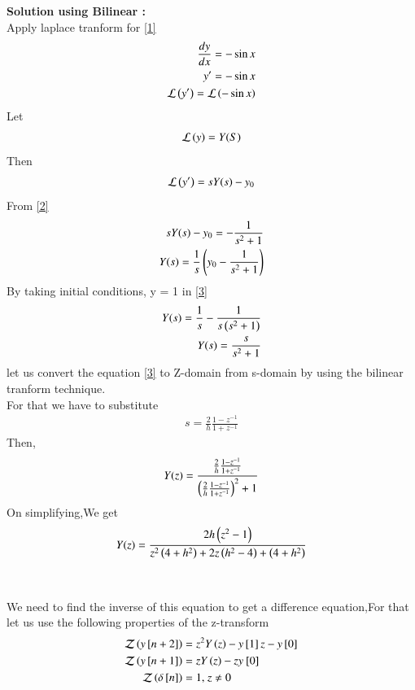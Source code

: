 \documentclass[journal]{IEEEtran}
\begin{document}
\textbf{Solution using Bilinear :} \\
Apply laplace tranform for \eqref{1} \\
\begin{align}
\frac{dy}{dx} = - \sin{x} \\
y' = - \sin{x} \\
\mathcal{L} \left(y'\right) = \mathcal{L} \left( - \sin{x} \right) \label{2}
\end{align}
Let 
\begin{align}
\mathcal{L} \left(y\right) = Y(S)\\
\end{align}
Then 
\begin{align}
\mathcal{L} \left(y'\right) = sY(s) - y_0
\end{align}
From \eqref{2}
\begin{align}
sY(s) - y_0 = -\frac{1}{s^2+1} \\
Y(s) = \frac{1}{s} \left(y_0 - \frac{1}{s^2+1}\right)  \label{3}
\end{align}
By taking initial conditions, y = 1 in \eqref{3}
\begin{align}
Y(s) = \frac{1}{s} - \frac{1}{s\left(s^2+1\right)} \\
Y(s) = \frac{s}{s^2+1} \label{3}
\end{align}
let us convert the equation \eqref{3} to Z-domain from s-domain by using the bilinear tranform technique. \\
For that we have to substitute 
\begin{align}
s = \frac{2}{h} \frac{1-z^{-1}}{1+z^{-1}}
\end{align}
Then,
\begin{align}
Y(z) = \frac{\frac{2}{h} \frac{1-z^{-1}}{1+z^{-1}}}{\left(\frac{2}{h} \frac{1-z^{-1}}{1+z^{-1}}\right)^2+1}
\end{align}
On simplifying,We get 
\begin{align}
Y(z) = \frac{2h\left(z^2-1\right)}{z^2\left(4+h^2\right)+2z\left(h^2-4\right)+\left(4+h^2\right)} \label{4}
\end{align} \\ \\ 
We need to find the inverse of this equation to get a difference equation,For that let us use the following properties of the z-transform 
\begin{align}
    \mathcal{Z}\brak{y\sbrak{n + 2}} &= z^2 Y\brak{z} - y\sbrak{1}z - y\sbrak{0}\\
    \mathcal{Z}\brak{y\sbrak{n + 1}} &= z Y\brak{z} - z y_\sbrak{0}\\
    \mathcal{Z}\brak{\delta\sbrak{n}} &= 1 \text{, } z \neq 0\\
\end{align}
\end{document}

